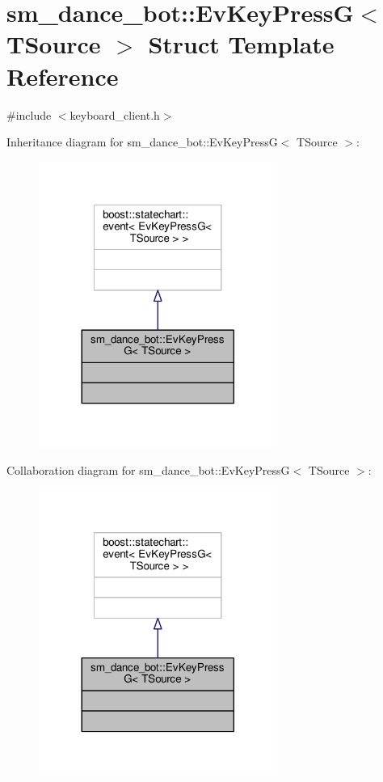 \hypertarget{structsm__dance__bot_1_1EvKeyPressG}{}\section{sm\+\_\+dance\+\_\+bot\+:\+:Ev\+Key\+PressG$<$ T\+Source $>$ Struct Template Reference}
\label{structsm__dance__bot_1_1EvKeyPressG}


{\ttfamily \#include $<$keyboard\+\_\+client.\+h$>$}



Inheritance diagram for sm\+\_\+dance\+\_\+bot\+:\+:Ev\+Key\+PressG$<$ T\+Source $>$\+:
\nopagebreak
\begin{figure}[H]
\begin{center}
\leavevmode
\includegraphics[width=221pt]{structsm__dance__bot_1_1EvKeyPressG__inherit__graph}
\end{center}
\end{figure}


Collaboration diagram for sm\+\_\+dance\+\_\+bot\+:\+:Ev\+Key\+PressG$<$ T\+Source $>$\+:
\nopagebreak
\begin{figure}[H]
\begin{center}
\leavevmode
\includegraphics[width=221pt]{structsm__dance__bot_1_1EvKeyPressG__coll__graph}
\end{center}
\end{figure}


